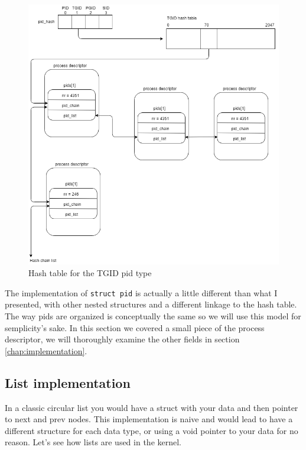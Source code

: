 \documentclass[10pt]{book}
\begin{document}
\begin{figure}[ht]
\includegraphics[width=\textwidth]{images/pidhash2.png}
\caption{Hash table for the TGID pid type}
\label{img:pidhash2}
\end{figure}

The implementation of \verb|struct pid| is actually a little different than what I presented, with other nested structures and a different linkage to the hash table. The way pids are organized is conceptually the same so we will use this model for semplicity's sake. In this section we covered a small piece of the process descriptor, we will thoroughly examine the other fields in section \ref{chap:implementation}.

\subsection{List implementation} In a classic circular list you would have a struct with your data and then pointer to next and prev nodes. This implementation is naive and would lead to have a different structure for each data type, or using a void pointer to your data for no reason. Let's see how lists are used in the kernel.
\end{document}
